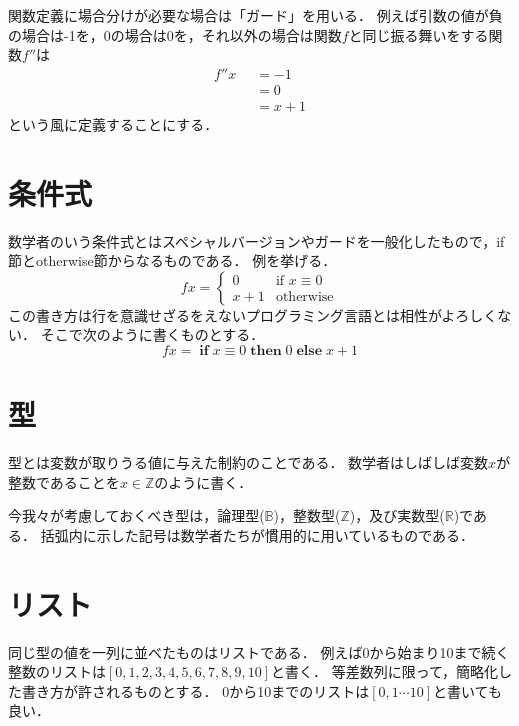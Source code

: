 \documentclass[twocolumn]{jsbook}
\newcommand{\guard}[1]{\mathop{\mid_{{#1}}}}
\newcommand{\mathif}{\mathop{\textbf{if}}}
\newcommand{\mathelse}{\mathop{\textbf{else}}}
\newcommand{\maththen}{\mathop{\textbf{then}}}
\begin{document}
関数定義に場合分けが必要な場合は「ガード」を用いる．
例えば引数の値が負の場合は-1を，0の場合は0を，それ以外の場合は関数$f$と同じ振る舞いをする関数$f''$は
\begin{equation}
\begin{split}
f''x&\guard{x<0}=-1\\
&\guard{x\equiv0}=0\\
&\guard{\text{otherwise}}=x+1
\end{split}
\end{equation}
という風に定義することにする．

\section{条件式}

数学者のいう条件式とはスペシャルバージョンやガードを一般化したもので，if節とotherwise節からなるものである．
例を挙げる．
\begin{equation}
fx=\begin{cases}
0&\text{if $x\equiv0$}\\
x+1&\text{otherwise}
\end{cases}
\end{equation}
この書き方は行を意識せざるをえないプログラミング言語とは相性がよろしくない．
そこで次のように書くものとする．
\begin{equation}
fx=\mathif x\equiv0\maththen0\mathelse x+1
\end{equation}


\section{型}

型とは変数が取りうる値に与えた制約のことである．
数学者はしばしば変数$x$が整数であることを$x\in\mathbb{Z}$のように書く．

今我々が考慮しておくべき型は，論理型($\mathbb{B}$)，整数型($\mathbb{Z}$)，及び実数型($\mathbb{R}$)である．
括弧内に示した記号は数学者たちが慣用的に用いているものである．

\section{リスト}

同じ型の値を一列に並べたものはリストである．
例えば0から始まり10まで続く整数のリストは$[0,1,2,3,4,5,6,7,8,9,10]$と書く．
等差数列に限って，簡略化した書き方が許されるものとする．
0から10までのリストは$[0,1\dotsb10]$と書いても良い．
\end{document}
